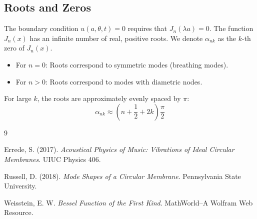 \documentclass[11pt, letterpaper]{article}
\begin{document}
\subsection{Roots and Zeros}
The boundary condition $u(a, \theta, t) = 0$ requires that $J_n(\lambda a) = 0$. The function $J_n(x)$ has an infinite number of real, positive roots. We denote $\alpha_{nk}$ as the $k$-th zero of $J_n(x)$.
\begin{itemize}
    \item For $n=0$: Roots correspond to symmetric modes (breathing modes).
    \item For $n>0$: Roots correspond to modes with diametric nodes.
\end{itemize}
For large $k$, the roots are approximately evenly spaced by $\pi$:
\begin{equation}
    \alpha_{nk} \approx \left(n + \frac{1}{2} + 2k\right)\frac{\pi}{2}
\end{equation}

\newpage

\begin{thebibliography}{9}

Errede, S. (2017). \textit{Acoustical Physics of Music: Vibrations of Ideal Circular Membranes}. UIUC Physics 406.

Russell, D. (2018). \textit{Mode Shapes of a Circular Membrane}. Pennsylvania State University.

Weisstein, E. W. \textit{Bessel Function of the First Kind}. MathWorld--A Wolfram Web Resource.

\end{thebibliography}
\end{document}
